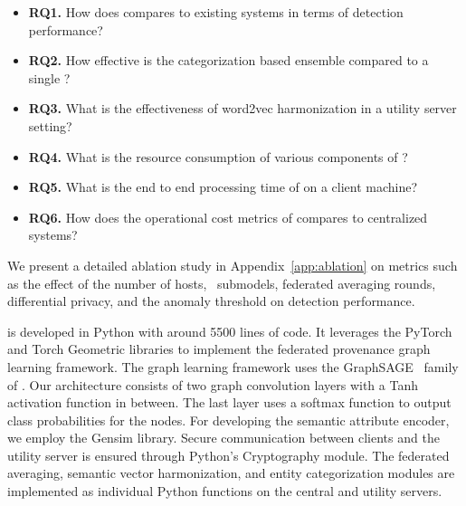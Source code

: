\begin{itemize}[leftmargin=*]
\item \textbf{RQ1.} How does \Sys compares to existing systems in terms of detection performance?
\item \textbf{RQ2.} How effective is the categorization based \gnnshort ensemble compared to a single \gnnshort? 
\item \textbf{RQ3.} What is the effectiveness of word2vec harmonization in a utility server setting?
\item \textbf{RQ4.} What is the resource consumption of various components of \Sys? 
\item \textbf{RQ5.} What is the end to end processing time of \Sys on a client machine? 
\item \textbf{RQ6.} How does the operational cost metrics of \Sys compares to centralized systems?

\end{itemize}


We present a detailed ablation study in Appendix~\ref{app:ablation} on metrics such as the effect of the number of hosts, \gnnshort\ submodels, federated averaging rounds, differential privacy, and the anomaly threshold on detection performance.

 \Sys is developed in Python with around 5500 lines of code. It leverages the PyTorch and Torch Geometric libraries to implement the federated provenance graph learning framework. The graph learning framework uses the GraphSAGE~\cite{hamilton2017inductive} family of \gnnshort. Our architecture consists of two graph convolution layers with a Tanh activation function in between. The last layer uses a softmax function to output class probabilities for the nodes. For developing the semantic attribute encoder, we employ the Gensim library. Secure communication between clients and the utility server is ensured through Python's Cryptography module. The federated averaging, semantic vector harmonization, and entity categorization modules are implemented as individual Python functions on the central and utility servers.


